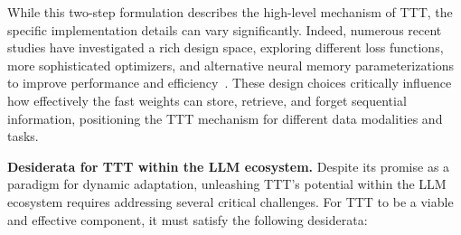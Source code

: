 While this two-step formulation describes the high-level mechanism of TTT, the specific implementation details can vary significantly. Indeed, numerous recent studies have investigated a rich design space, exploring different loss functions, more sophisticated optimizers, and alternative neural memory parameterizations to improve performance and efficiency~\citep{wang2025test, behrouz2024titans, behrouz2025s, karami2025lattice}. These design choices critically influence how effectively the fast weights can store, retrieve, and forget sequential information, positioning the TTT mechanism for different data modalities and tasks.

\textbf{Desiderata for TTT within the LLM ecosystem.}
Despite its promise as a paradigm for dynamic adaptation, unleashing TTT's potential within the LLM ecosystem requires addressing several critical challenges. For TTT to be a viable and effective component, it must satisfy the following desiderata:
